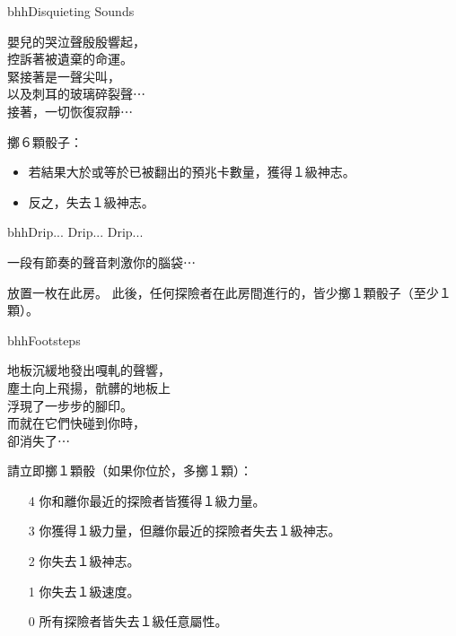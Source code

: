 \linebreak[0]%
\begin{EventCard}{bhh}{Disquieting Sounds}
  \begin{CardStory}
    嬰兒的哭泣聲殷殷響起，\\
    控訴著被遺棄的命運。\\
    緊接著是一聲尖叫，\\
    以及刺耳的玻璃碎裂聲⋯\\
    接著，一切恢復寂靜⋯
  \end{CardStory}
  擲６顆骰子：
  \begin{itemize}
    \item 若結果大於或等於已被翻出的預兆卡數量，獲得１級神志。
    \item 反之，失去１級神志。
  \end{itemize}
\end{EventCard}%
\linebreak[0]%
\begin{EventCard}{bhh}{Drip... Drip... Drip...}
  \begin{CardStory}
    一段有節奏的聲音刺激你的腦袋⋯
  \end{CardStory}
  放置一枚在此房。\smallbreak
  此後，任何探險者在此房間進行的，皆少擲１顆骰子（至少１顆）。\smallbreak
\end{EventCard}%
\linebreak[0]%
\begin{EventCard}{bhh}{Footsteps}
  \begin{CardStory}
    地板沉緩地發出嘎軋的聲響，\\
    塵土向上飛揚，骯髒的地板上\\
    浮現了一步步的腳印。\\
    而就在它們快碰到你時，\\
    卻消失了⋯
  \end{CardStory}
  請立即擲１顆骰（如果你位於，多擲１顆）：
  \begin{itemize}
    \item[4] 你和離你最近的探險者皆獲得１級力量。
    \item[3] 你獲得１級力量，但離你最近的探險者失去１級神志。
    \item[2] 你失去１級神志。
    \item[1] 你失去１級速度。
    \item[0] 所有探險者皆失去１級任意屬性。
  \end{itemize}
\end{EventCard}%
\linebreak[0]%

